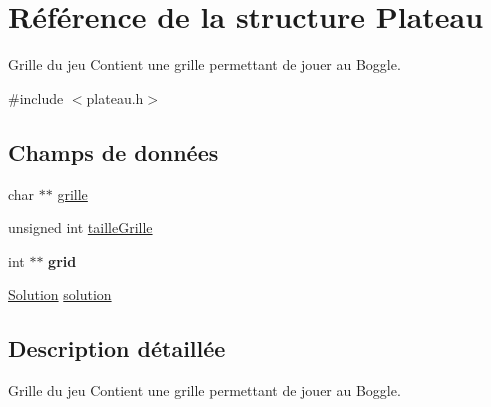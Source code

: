 \hypertarget{structPlateau}{\section{Référence de la structure Plateau}
\label{structPlateau}
}


Grille du jeu Contient une grille permettant de jouer au Boggle.  




{\ttfamily \#include $<$plateau.\-h$>$}

\subsection*{Champs de données}
\begin{DoxyCompactItemize}
\item 
char $\ast$$\ast$ \hyperlink{structPlateau_a42411aa44b78d298681030ce3461f686}{grille}
\item 
unsigned int \hyperlink{structPlateau_aa71d603afaf91ff7c81427af61919a34}{taille\-Grille}
\item 
\hypertarget{structPlateau_aeb94d618db5af1b25a4f64042a4ad771}{int $\ast$$\ast$ {\bfseries grid}}\label{structPlateau_aeb94d618db5af1b25a4f64042a4ad771}

\item 
\hyperlink{structSolution}{Solution} \hyperlink{structPlateau_aed88af50891b17edcd3ba97d7098dfde}{solution}
\end{DoxyCompactItemize}


\subsection{Description détaillée}
Grille du jeu Contient une grille permettant de jouer au Boggle. 

